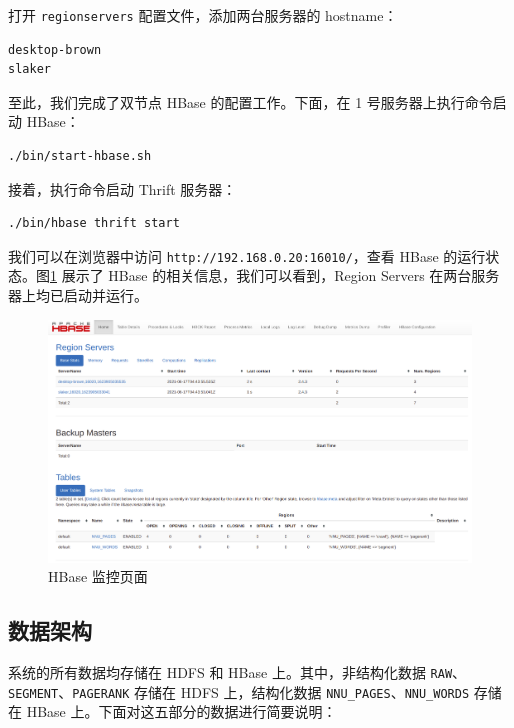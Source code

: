 \documentclass{ctexart}
\newcommand{\code}[1]{\colorbox{backcolor}{\lstinline|#1|}}
\begin{document}
    打开 \code{regionservers} 配置文件，添加两台服务器的 hostname：

    \begin{lstlisting}[language=bash]
desktop-brown
slaker
    \end{lstlisting}

    至此，我们完成了双节点 HBase 的配置工作。下面，在 1 号服务器上执行命令启动 HBase：

    \begin{lstlisting}[language=bash]
./bin/start-hbase.sh
    \end{lstlisting}

    接着，执行命令启动 Thrift 服务器：

    \begin{lstlisting}[language=bash]
./bin/hbase thrift start
    \end{lstlisting}

    我们可以在浏览器中访问 \code{http://192.168.0.20:16010/}，查看 HBase 的运行状态。图\ref{fig:archicture_hbase-web} 展示了 HBase 的相关信息，我们可以看到，Region Servers 在两台服务器上均已启动并运行。

    \begin{figure}[t]
        \centering
        \includegraphics[width=\textwidth]{src/archicture_hbase-web}
        \caption{HBase 监控页面}
        \label{fig:archicture_hbase-web}
    \end{figure}

    \subsection{数据架构}\label{subsec:crawl}

    系统的所有数据均存储在 HDFS 和 HBase 上。其中，非结构化数据 \code{RAW}、\code{SEGMENT}、\code{PAGERANK} 存储在 HDFS 上，结构化数据 \code{NNU_PAGES}、\code{NNU_WORDS} 存储在 HBase 上。下面对这五部分的数据进行简要说明：
\end{document}
